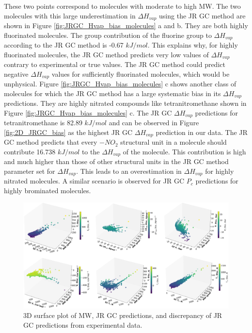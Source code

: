 \documentclass[journal=jacsat,manuscript=article]{achemso}
\begin{document}
These two points correspond to molecules with moderate to high MW. The two molecules with this large underestimation in  $\Delta H_{vap}$ using the JR GC method are shown in Figure \ref{fig:JRGC_Hvap_bias_molecules} a and b. They are both highly fluorinated molecules. The group contribution of the fluorine group to $\Delta H_{vap}$ according to the JR GC method is -0.67 $kJ/mol$. This explains why, for highly fluorinated molecules, the JR GC method predicts very low values of $\Delta H_{vap}$ contrary to experimental or true values. The JR GC method could predict negative $\Delta H_{vap}$ values for sufficiently fluorinated molecules, which would be unphysical. Figure \ref{fig:JRGC_Hvap_bias_molecules} c shows another class of molecules for which the JR GC method has a large systematic bias in its $\Delta H_{vap}$ predictions. They are highly nitrated compounds like tetranitromethane shown in Figure \ref{fig:JRGC_Hvap_bias_molecules} c. The JR GC $\Delta H_{vap}$ predictions for tetranitromethane is 82.89 $kJ/mol$ and can be observed in Figure \ref{fig:2D_JRGC_bias} as the highest JR GC $\Delta H_{vap}$ prediction in our data. The JR GC method predicts that every $-NO_2$ structural unit in a molecule should contribute 16.738 $kJ/mol$ to the $\Delta H_{vap}$ of the molecule. This contribution is high and much higher than those of other structural units in the JR GC method parameter set for $\Delta H_{vap}$. This leads to an overestimation in $\Delta H_{vap}$ for highly nitrated molecules.
A similar scenario is observed for JR GC $P_c$ predictions for highly brominated molecules.  


\begin{figure}[H]
    \centering
    \includegraphics[width=1.1\linewidth]{images/3D_gc_mw_exp.png}
    \caption{3D surface plot of MW, JR GC predictions, and discrepancy of JR GC predictions from experimental data.}
    \label{fig:3D_JRGC_MW_disc}
\end{figure}
\end{document}
